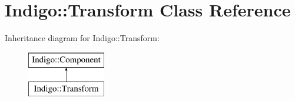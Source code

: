 \hypertarget{class_indigo_1_1_transform}{}\section{Indigo\+:\+:Transform Class Reference}
\label{class_indigo_1_1_transform}
Inheritance diagram for Indigo\+:\+:Transform\+:\begin{figure}[H]
\begin{center}
\leavevmode
\includegraphics[height=2.000000cm]{class_indigo_1_1_transform}
\end{center}
\end{figure}
